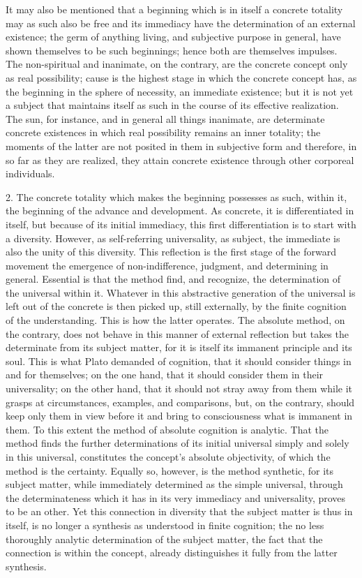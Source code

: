 It may also be mentioned that a beginning which is in itself a concrete
totality may as such also be free and its immediacy have the determination
of an external existence; the germ of anything living, and subjective purpose
in general, have shown themselves to be such beginnings; hence both are
themselves impulses. The non-spiritual and inanimate, on the contrary, are
the concrete concept only as real possibility; cause is the highest stage in
which the concrete concept has, as the beginning in the sphere of necessity,
an immediate existence; but it is not yet a subject that maintains itself
as such in the course of its effective realization. The sun, for instance,
and in general all things inanimate, are determinate concrete existences
in which real possibility remains an inner totality; the moments of the
latter are not posited in them in subjective form and therefore, in so far
as they are realized, they attain concrete existence through other corporeal
individuals.

2. The concrete totality which makes the beginning possesses as such,
within it, the beginning of the advance and development.
As concrete, it is differentiated in itself,
but because of its initial immediacy, this first
differentiation is to start with a diversity.
However, as self-referring universality, as subject,
the immediate is also the unity of this diversity.
This reflection is the first stage of the forward movement
the emergence of non-indifference, judgment, and determining in general.
Essential is that the method find, and recognize,
the determination of the universal within it.
Whatever in this abstractive generation of the universal
is left out of the concrete is then picked up, still externally,
by the finite cognition of the understanding.
This is how the latter operates.
The absolute method, on the contrary, does not behave
in this manner of external reflection
but takes the determinate from its subject matter,
for it is itself its immanent principle and its soul.
This is what Plato demanded of cognition,
that it should consider things in and for themselves;
on the one hand, that it should consider them in their universality;
on the other hand, that it should not stray away from them
while it grasps at circumstances, examples, and comparisons,
but, on the contrary, should keep only them in view before it
and bring to consciousness what is immanent in them.
To this extent the method of absolute cognition is analytic.
That the method finds the further determinations
of its initial universal simply and solely in this universal,
constitutes the concept's absolute objectivity,
of which the method is the certainty.
Equally so, however, is the method synthetic,
for its subject matter,
while immediately determined as the simple universal,
through the determinateness which it has
in its very immediacy and universality,
proves to be an other.
Yet this connection in diversity
that the subject matter is thus in itself,
is no longer a synthesis as understood in finite cognition;
the no less thoroughly analytic determination of the subject matter,
the fact that the connection is within the concept,
already distinguishes it fully from the latter synthesis.

